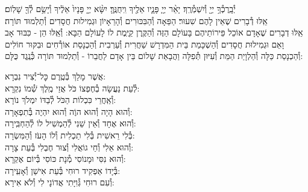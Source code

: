 \documentclass[twoside, openany, parskip=half, 11pt]{book}
\begin{document}
יְ֯בָֽרֶכְ֯ךָ֥ יְיָ֖ וְ֯יִשְׁמְ֯רֶֽךָ׃ יָאֵ֨ר יְיָ֧ פָּנָ֛יו אֵלֶ֖יךָ וִֽיחֻנֶּֽךָּ׃ יִשָּׂ֨א יְיָ֤ פָּנָיו֙ אֵלֶ֔יךָ וְ֯יָשֵׂ֥ם לְ֯ךָ֖ שָׁלֽוֹם׃\\
אֵֽלּוּ דְ֯בָרִים שֶׁאֵין לָהֶם שִׁעוּר׃ הַפֵּאָה וְ֯הַבִּכּוּרִים וְ֯הָרֵאָיוֹן וּגְמִילוּת חֲסָדִים וְ֯תַלְמוּד תּוֹרָה׃\\
אֵֽלּוּ דְבָרִים שֶׁאָדָם אוֹכֵל פֵּירוֹתֵיהֶם בָּעוֹלָם הַזֶּה וְ֯הַקֶּֽרֶן קַיֶּֽמֶת לוֹ לָעוֹלָם הַבָּא: וְ֯אֵֽלּוּ הֵן - כִּבּוּד אָב וָאֵם וּגְמִילוּת חֲסָדִים וְ֯הַשְׁכָּמַת בֵּית הַמִּדְרָשׁ שַׁחֲרִית וְ֯עַרְבִית וְ֯הַכְנָסַת אוֹרְ֯חִים וּבִקּוּר חוֹלִים וְ֯הַכְנָסַת כַּלָּה וְ֯הַלְוָיַת הַמֵּת וְ֯עִיּוּן תְּ֯פִלָּה וַהֲבָאַת שָׁלוֹם בֵּין אָדָם לַחֲבֵרוֹ - וְ֯תַלְמוּד תּוֹרָה כְּ֯נֶֽגֶד כֻּלָּם:




\newcommand{\adonolam}{

\firstword{אֲדוֹן עוֹלָם}
אֲשֶׁר מָלַךְ \hfill בְּ֯טֶֽרֶם כׇּל־יְ֯צִיר נִבְרָא: \\
לְ֯עֵת נַעֲשָׂה בְ֯חֶפְצוֹ כֹּל \hfill אֲזַי מֶֽלֶךְ שְׁ֯מוֹ נִקְרָא:\\
וְ֯אַֽחֲרֵי כִּכְלוֹת הַכֹּל \hfill לְ֯בַדּוֹ יִמְלֹךְ נוֹרָא: \\
וְ֯הוּא הָיָה וְ֯הוּא הוֶֹה \hfill וְ֯הוּא יִהְיֶה בְּ֯תִפְאָרָה: \\
וְ֯הוּא אֶחָד וְ֯אֵין שֵׁנִי \hfill לְ֯הַמְשִׁיל לוֹ לְ֯הַחְבִּֽירָה: \\
בְּ֯לִי רֵאשִׁית בְּ֯לִי תַכְלִית \hfill וְ֯לוֹ הָעֹז וְ֯הַמִּשְׂרָה: \\
וְ֯הוּא אֵלִי וְ֯חַי גוֹאֲלִי \hfill וְ֯צוּר חֶבְלִי בְּ֯עֵת צָרָה: \\
וְ֯הוּא נִסִּי וּמָנוֹסִי \hfill מְ֯נָת כּוֹסִי בְּ֯יוֹם אֶקְרָא: \\
בְּ֯יָדוֹ אַפְקִיד רוּחִי \hfill בְּ֯עֵת אִישַׁן וְ֯אָעִֽירָה: \\
וְ֯עִם רוּחִי גְּ֯וִיָּתִי \hfill אֲדוֹנָי לִי וְ֯לֹא אִירָא:
}
\adonolam
\end{document}
